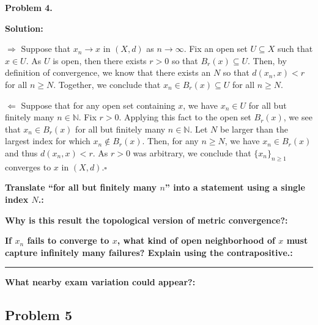\documentclass[12pt]{article}
\newcommand{\fillfield}[1]{%
  \par\noindent\textbf{#1:}\enspace\hrulefill\par\vspace{3pt}%
}
\newcommand{\fillfieldlong}[1]{%
  \par\noindent\textbf{#1:}\par\vspace{1.5cm}%
  \noindent\rule{\linewidth}{0.35pt}\par\vspace{4pt}%
}
\begin{document}
\begin{tcolorbox}[
  enhanced, breakable,
  colback  = solgreen,
  colframe = green!45!black,
  fonttitle = \bfseries,
  title = {\textsc{Official Solution}\hfill Homework 9 -- Solutions}
]
\textbf{Problem 4.}

\medskip\textbf{Solution:}

\medskip
$\Longrightarrow$ Suppose that $x_n \to x$ in $(X, d)$ as $n \to \infty$. Fix an open set $U \subseteq X$ such
that $x \in U$. As $U$ is open, then there exists $r > 0$ so that $B_r(x) \subseteq U$. Then, by definition of
convergence, we know that there exists an $N$ so that $d(x_n, x) < r$ for all $n \ge N$. Together,
we conclude that $x_n \in B_r(x) \subseteq U$ for all $n \ge N$.

\medskip
$\Longleftarrow$ Suppose that for any open set containing $x$, we have $x_n \in U$ for all but finitely
many $n \in \mathbb{N}$. Fix $r > 0$. Applying this fact to the open set $B_r(x)$, we see that $x_n \in B_r(x)$ for
all but finitely many $n \in \mathbb{N}$. Let $N$ be larger than the largest index for which $x_n \notin B_r(x)$.
Then, for any $n \ge N$, we have $x_n \in B_r(x)$ and thus $d(x_n, x) < r$. As $r > 0$ was arbitrary,
we conclude that $\{x_n\}_{n\ge1}$ converges to $x$ in $(X, d)$.\hfill$\square$
\end{tcolorbox}

\bigskip

\begin{tcolorbox}[
  enhanced, breakable,
  colback  = reflectcyan,
  colframe = cyan!55!black,
  fonttitle = \bfseries,
  title = {\textsc{Reflection \& Variation}}
]
\fillfield{Translate ``for all but finitely many $n$'' into a statement using a single index $N$.}
\fillfield{Why is this result the topological version of metric convergence?}
\fillfieldlong{If $x_n$ fails to converge to $x$, what kind of open neighborhood of $x$ must capture infinitely many failures? Explain using the contrapositive.}
\fillfield{What nearby exam variation could appear?}
\end{tcolorbox}

\newpage
\subsection{Problem 5}
\end{document}
